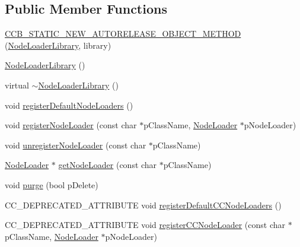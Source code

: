 \subsection*{Public Member Functions}
\begin{DoxyCompactItemize}
\item 
\hyperlink{classcocosbuilder_1_1NodeLoaderLibrary_aa961f431fa484e1ef7042d3759145ef9}{C\+C\+B\+\_\+\+S\+T\+A\+T\+I\+C\+\_\+\+N\+E\+W\+\_\+\+A\+U\+T\+O\+R\+E\+L\+E\+A\+S\+E\+\_\+\+O\+B\+J\+E\+C\+T\+\_\+\+M\+E\+T\+H\+OD} (\hyperlink{classcocosbuilder_1_1NodeLoaderLibrary}{Node\+Loader\+Library}, library)
\item 
\hyperlink{classcocosbuilder_1_1NodeLoaderLibrary_a18731618610d1221e83013b352c271a9}{Node\+Loader\+Library} ()
\item 
virtual \hyperlink{classcocosbuilder_1_1NodeLoaderLibrary_a0daf8f4fa7a9d25e42588c4abea45cc7}{$\sim$\+Node\+Loader\+Library} ()
\item 
void \hyperlink{classcocosbuilder_1_1NodeLoaderLibrary_a184ce1aaca6719538595f4c1de1bb1f1}{register\+Default\+Node\+Loaders} ()
\item 
void \hyperlink{classcocosbuilder_1_1NodeLoaderLibrary_a00533551fa2421b2ea9d335c9c411ed4}{register\+Node\+Loader} (const char $\ast$p\+Class\+Name, \hyperlink{classcocosbuilder_1_1NodeLoader}{Node\+Loader} $\ast$p\+Node\+Loader)
\item 
void \hyperlink{classcocosbuilder_1_1NodeLoaderLibrary_a5439bef5ff6d008c89f1fc8c5300b701}{unregister\+Node\+Loader} (const char $\ast$p\+Class\+Name)
\item 
\hyperlink{classcocosbuilder_1_1NodeLoader}{Node\+Loader} $\ast$ \hyperlink{classcocosbuilder_1_1NodeLoaderLibrary_a0a4d080516631cff92908b4ae06dadf8}{get\+Node\+Loader} (const char $\ast$p\+Class\+Name)
\item 
void \hyperlink{classcocosbuilder_1_1NodeLoaderLibrary_a2957be41c81e744356bf79275e825663}{purge} (bool p\+Delete)
\item 
C\+C\+\_\+\+D\+E\+P\+R\+E\+C\+A\+T\+E\+D\+\_\+\+A\+T\+T\+R\+I\+B\+U\+TE void \hyperlink{classcocosbuilder_1_1NodeLoaderLibrary_acaa7e8d1a3de9d2d6fc823053ba6a972}{register\+Default\+C\+C\+Node\+Loaders} ()
\item 
C\+C\+\_\+\+D\+E\+P\+R\+E\+C\+A\+T\+E\+D\+\_\+\+A\+T\+T\+R\+I\+B\+U\+TE void \hyperlink{classcocosbuilder_1_1NodeLoaderLibrary_ab1085bafb54a6b274a0e2a1b692207d6}{register\+C\+C\+Node\+Loader} (const char $\ast$p\+Class\+Name, \hyperlink{classcocosbuilder_1_1NodeLoader}{Node\+Loader} $\ast$p\+Node\+Loader)

\end{DoxyCompactItemize}
